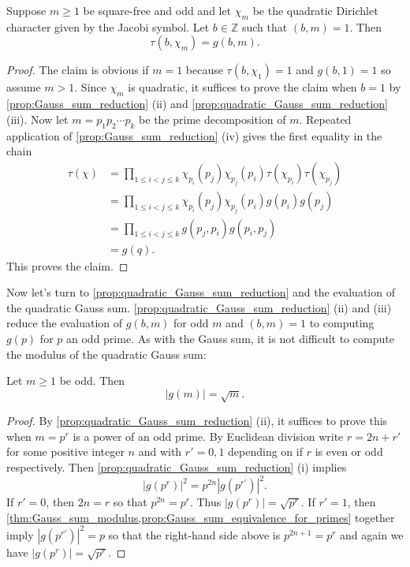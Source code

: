       \begin{theorem}
        Suppose $m \ge 1$ be square-free and odd and let $\chi_{m}$ be the quadratic Dirichlet character given by the Jacobi symbol. Let $b \in \mathbb{Z}$ such that $(b,m) = 1$. Then
        \[
          \tau(b,\chi_{m}) = g(b,m).
        \]
      \end{theorem}
      \begin{proof}
        The claim is obvious if $m = 1$ because $\tau(b,\chi_{1}) = 1$ and $g(b,1) = 1$ so assume $m > 1$. Since $\chi_{m}$ is quadratic, it suffices to prove the claim when $b = 1$ by \cref{prop:Gauss_sum_reduction} (ii) and \cref{prop:quadratic_Gauss_sum_reduction} (iii). Now let $m = p_{1}p_{2} \cdots p_{k}$ be the prime decomposition of $m$. Repeated application of \cref{prop:Gauss_sum_reduction} (iv) gives the first equality in the chain
        \begin{align*}
          \tau(\chi) &= \prod_{1 \le i < j \le k}\chi_{p_{i}}(p_{j})\chi_{p_{j}}(p_{i})\tau(\chi_{p_{i}})\tau(\chi_{p_{j}}) \\
          &= \prod_{1 \le i < j \le k}\chi_{p_{i}}(p_{j})\chi_{p_{j}}(p_{i})g(p_{i})g(p_{j}) \\
          &= \prod_{1 \le i < j \le k}g(p_{j},p_{i})g(p_{i},p_{j}) \\
          &= g(q).
        \end{align*}
        This proves the claim.
      \end{proof}

      Now let's turn to \cref{prop:quadratic_Gauss_sum_reduction} and the evaluation of the quadratic Gauss sum. \cref{prop:quadratic_Gauss_sum_reduction} (ii) and (iii) reduce the evaluation of $g(b,m)$ for odd $m$ and $(b,m) = 1$ to computing $g(p)$ for $p$ an odd prime. As with the Gauss sum, it is not difficult to compute the modulus of the quadratic Gauss sum:

      \begin{theorem}\label{thm:quadratic_Gauss_sum_modulus}
        Let $m \ge 1$ be odd. Then
        \[
          |g(m)| = \sqrt{m}.
        \]
      \end{theorem}
      \begin{proof}
        By \cref{prop:quadratic_Gauss_sum_reduction} (ii), it suffices to prove this when $m = p^{r}$ is a power of an odd prime. By Euclidean division write $r = 2n+r'$ for some positive integer $n$ and with $r' = 0,1$ depending on if $r$ is even or odd respectively. Then \cref{prop:quadratic_Gauss_sum_reduction} (i) implies
        \[
          |g(p^{r})|^{2} = p^{2n}|g(p^{r'})|^{2}.
        \]
        If $r' = 0$, then $2n = r$ so that $p^{2n} = p^{r}$. Thus $|g(p^{r})| = \sqrt{p^{r}}$. If $r' = 1$, then \cref{thm:Gauss_sum_modulus,prop:Gauss_sum_equivalence_for_primes} together imply $|g(p^{r'})|^{2} = p$ so that the right-hand side above is $p^{2n+1} = p^{r}$ and again we have $|g(p^{r})| = \sqrt{p^{r}}$.
      \end{proof}

